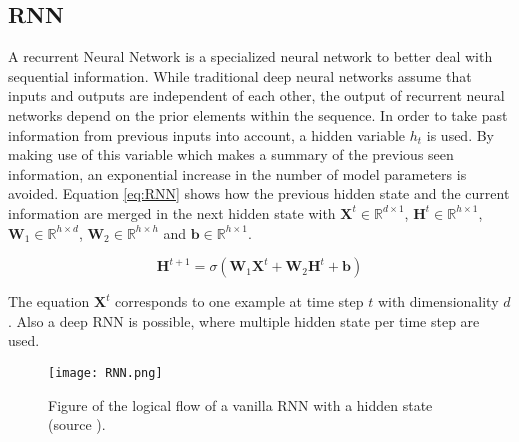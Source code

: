 \subsection{RNN}
A recurrent Neural Network is a specialized neural network to better deal with sequential information. While traditional deep neural networks assume that inputs and outputs are independent of each other, the output of recurrent neural networks depend on the prior elements within the sequence. In order to take past information from previous inputs into account, a hidden variable $ h_t $ is used. By making use of this variable which makes a summary of the previous seen information, an exponential increase in the number of model parameters is avoided. Equation \ref{eq:RNN} shows how the previous hidden state and the current information are merged in the next hidden state with $ \textbf{X}^t\in \mathbb{R}^{d\times 1} $, $ \textbf{H}^t\in \mathbb{R}^{h\times 1} $, $ \textbf{W}_1\in \mathbb{R}^{h\times d} $, $\textbf{W}_2\in \mathbb{R}^{h\times h} $ and $ \textbf{b}\in \mathbb{R}^{h\times 1} $. 

\begin{equation}\label{eq:RNN}
	\textbf{H}^{t+1} = \sigma(\textbf{W}_1\textbf{X}^{t}+\textbf{W}_2\textbf{H}^{t}+\textbf{b})
\end{equation}

The equation $\textbf{X}^t$ corresponds to one example at time step $ t $ with dimensionality $ d $. 
Also a deep RNN is possible, where multiple hidden state per time step are used. \\



\begin{figure}[h!]
	\centering
	\texttt{[image: RNN.png]}
	\caption{Figure of the logical flow of a vanilla RNN with a hidden state (source \cite{Czum2020}).}
	\label{fig:RNN}
\end{figure}




